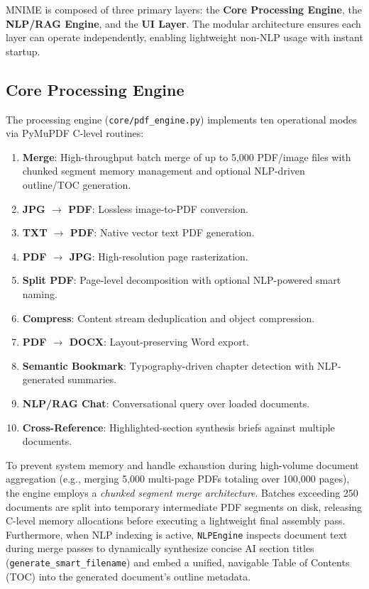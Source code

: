 \documentclass[11pt]{article}
\begin{document}
MNIME is composed of three primary layers: the \textbf{Core Processing
Engine}, the \textbf{NLP/RAG Engine}, and the \textbf{UI Layer}.
The modular architecture ensures each layer can operate independently,
enabling lightweight non-NLP usage with instant startup.

\subsection{Core Processing Engine}

The processing engine (\texttt{core/pdf\_engine.py}) implements ten
operational modes via PyMuPDF C-level routines:

\begin{enumerate}
    \item \textbf{Merge}: High-throughput batch merge of up to 5,000 PDF/image files with chunked segment memory management and optional NLP-driven outline/TOC generation.
    \item \textbf{JPG $\rightarrow$ PDF}: Lossless image-to-PDF conversion.
    \item \textbf{TXT $\rightarrow$ PDF}: Native vector text PDF generation.
    \item \textbf{PDF $\rightarrow$ JPG}: High-resolution page rasterization.
    \item \textbf{Split PDF}: Page-level decomposition with optional NLP-powered smart naming.
    \item \textbf{Compress}: Content stream deduplication and object compression.
    \item \textbf{PDF $\rightarrow$ DOCX}: Layout-preserving Word export.
    \item \textbf{Semantic Bookmark}: Typography-driven chapter detection with NLP-generated summaries.
    \item \textbf{NLP/RAG Chat}: Conversational query over loaded documents.
    \item \textbf{Cross-Reference}: Highlighted-section synthesis briefs against multiple documents.
\end{enumerate}

To prevent system memory and handle exhaustion during high-volume document aggregation (e.g., merging 5,000 multi-page PDFs totaling over 100,000 pages), the engine employs a \textit{chunked segment merge architecture}. Batches exceeding 250 documents are split into temporary intermediate PDF segments on disk, releasing C-level memory allocations before executing a lightweight final assembly pass. Furthermore, when NLP indexing is active, \texttt{NLPEngine} inspects document text during merge passes to dynamically synthesize concise AI section titles (\texttt{generate\_smart\_filename}) and embed a unified, navigable Table of Contents (TOC) into the generated document's outline metadata.
\end{document}
